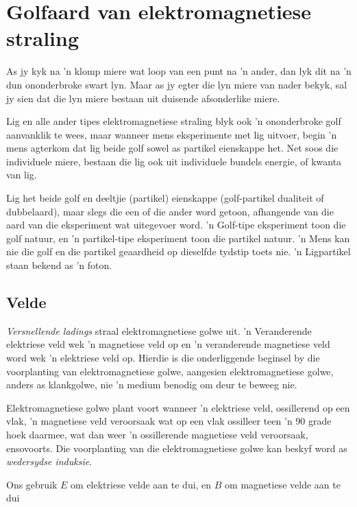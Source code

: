     \label{m38777*cid3}
            \section{Golfaard van e\-lek\-tro\-mag\-ne\-tie\-se straling}
            \nopagebreak
      \label{m38777*id186686}As jy kyk na 'n klomp miere wat loop van een punt na 'n ander, dan lyk dit na 'n dun ononderbroke swart lyn. Maar as jy egter die lyn miere van nader bekyk, sal jy sien dat die lyn miere bestaan uit duisende afsonderlike miere.\par 
      \label{m38777*id187029}Lig en alle ander tipes elektromagnetiese straling blyk ook 'n ononderbroke golf aanvanklik te wees, maar wanneer mens eksperimente met lig uitvoer, begin 'n mens agterkom dat lig beide golf sowel as partikel eienskappe het. Net soos die individuele miere, bestaan die lig ook uit individuele bundels energie, of kwanta van lig.\par 
     
 \label{m38777*id187035}Lig het beide golf en deeltjie (partikel) eienskappe (golf-partikel dualiteit of dubbelaard), maar slegs die een of die ander word getoon, afhangende van die aard van die eksperiment wat uitegevoer word. 'n Golf-tipe eksperiment toon die golf natuur, en 'n partikel-tipe eksperiment toon die partikel natuur. 'n Mens kan nie die golf en die partikel geaardheid op dieselfde tydstip toets nie. 'n Ligpartikel staan bekend as 'n foton.\par 







\subsection*{Velde}
            \nopagebreak
      \label{m38777*id187125}\textit{Versnellende ladings} straal elektromagnetiese golwe uit. 'n Veranderende elektriese veld wek 'n magnetiese veld op en 'n veranderende magnetiese veld word wek 'n elektriese veld op. Hierdie is die onderliggende beginsel by die voorplanting van elektromagnetiese golwe, aangesien elektromagnetiese golwe, anders as klankgolwe, nie 'n medium benodig om deur te beweeg nie.  


E\-lek\-tro\-mag\-ne\-tie\-se golwe plant voort wanneer 'n elektriese veld, ossillerend op een vlak, 'n magnetiese veld veroorsaak wat op een vlak ossilleer teen 'n 90 grade hoek daarmee, wat dan weer 'n ossillerende magnetiese veld veroorsaak, ensovoorts.   Die voorplanting van die elektromagnetiese golwe kan beskyf word as \textsl{wedersydse induksie}.\par Ons gebruik $E$ om elektriese velde aan te dui, en $B$ om magnetiese velde aan te dui\par


